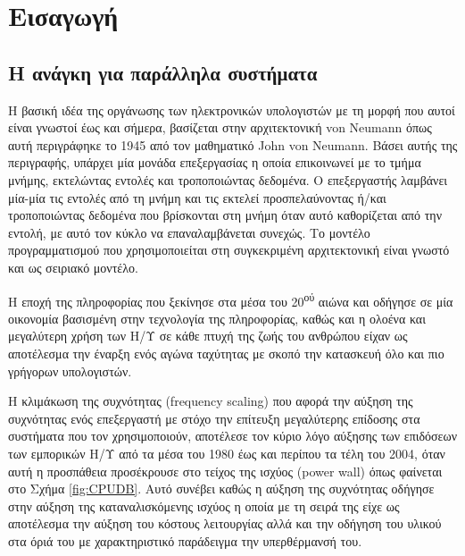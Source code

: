 \chapter{Εισαγωγή}
\label{ch:Introduction}

\section{Η ανάγκη για παράλληλα συστήματα} %
\label{sec:The need for parallel systems}
Η βασική ιδέα της οργάνωσης των ηλεκτρονικών υπολογιστών με τη μορφή που αυτοί είναι γνωστοί έως και σήμερα, βασίζεται στην αρχιτεκτονική von Neumann όπως αυτή περιγράφηκε το 1945 από τον μαθηματικό John von Neumann. Βάσει αυτής της περιγραφής, υπάρχει μία μονάδα επεξεργασίας η οποία επικοινωνεί με το τμήμα μνήμης, εκτελώντας εντολές και τροποποιώντας δεδομένα. Ο επεξεργαστής λαμβάνει μία-μία τις εντολές από τη μνήμη και τις εκτελεί προσπελαύνοντας ή/και τροποποιώντας δεδομένα που βρίσκονται στη μνήμη όταν αυτό καθορίζεται από την εντολή, με αυτό τον κύκλο να επαναλαμβάνεται συνεχώς. Το μοντέλο προγραμματισμού που χρησιμοποιείται στη συγκεκριμένη αρχιτεκτονική είναι γνωστό και ως σειριακό μοντέλο.


Η εποχή της πληροφορίας που ξεκίνησε στα μέσα του 20\textsuperscript{ού} αιώνα και οδήγησε σε μία οικονομία βασισμένη στην τεχνολογία της πληροφορίας, καθώς και η ολοένα και μεγαλύτερη χρήση των Η/Υ σε κάθε πτυχή της ζωής του ανθρώπου είχαν ως αποτέλεσμα την έναρξη ενός αγώνα ταχύτητας με σκοπό την κατασκευή όλο και πιο γρήγορων υπολογιστών.

Η κλιμάκωση της συχνότητας (frequency scaling) που αφορά την αύξηση της συχνότητας ενός επεξεργαστή με στόχο την επίτευξη μεγαλύτερης επίδοσης στα συστήματα που τον χρησιμοποιούν, αποτέλεσε τον κύριο λόγο αύξησης των επιδόσεων των εμπορικών Η/Υ από τα μέσα του 1980 έως και περίπου τα τέλη του 2004, όταν αυτή η προσπάθεια προσέκρουσε στο τείχος της ισχύος (power wall) όπως φαίνεται στο Σχήμα \ref{fig:CPUDB}. Αυτό συνέβει καθώς η αύξηση της συχνότητας οδήγησε στην αύξηση της καταναλισκόμενης ισχύος η οποία με τη σειρά της είχε ως αποτέλεσμα την αύξηση του κόστους λειτουργίας αλλά και την οδήγηση του υλικού στα όριά του με χαρακτηριστικό παράδειγμα την υπερθέρμανσή του.

